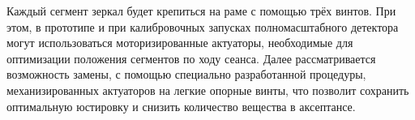 




Каждый сегмент зеркал будет крепиться на раме с помощью трёх винтов. При этом, в прототипе и при калибровочных запусках полномасштабного детектора могут использоваться моторизированные актуаторы, необходимые для оптимизации положения сегментов по ходу сеанса. Далее рассматривается возможность замены, с помощью специально разработанной процедуры, механизированных актуаторов на легкие опорные винты, что позволит сохранить оптимальную юстировку и снизить количество вещества в аксептансе.


